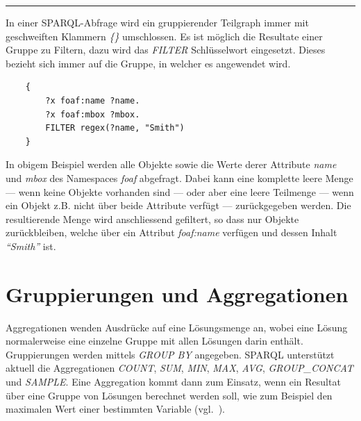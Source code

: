 \noindent\rule[1ex]{\textwidth}{1pt}

In einer SPARQL-Abfrage wird ein gruppierender Teilgraph immer mit geschweiften Klammern \textit{\{\}} umschlossen. Es ist möglich die Resultate einer Gruppe zu Filtern, dazu wird das \textit{FILTER} Schlüsselwort eingesetzt. Dieses bezieht sich immer auf die Gruppe, in welcher es angewendet wird.

\lstset{language=XML}
\begin{lstlisting}
    {
        ?x foaf:name ?name.
        ?x foaf:mbox ?mbox.
        FILTER regex(?name, "Smith")
    }
\end{lstlisting}

In obigem Beispiel werden alle Objekte sowie die Werte derer Attribute \textit{name} und \textit{mbox} des Namespaces \textit{foaf} abgefragt. Dabei kann eine komplette leere Menge --- wenn keine Objekte vorhanden sind --- oder aber eine leere Teilmenge --- wenn ein Objekt z.B. nicht über beide Attribute verfügt --- zurückgegeben werden. Die resultierende Menge wird anschliessend gefiltert, so dass nur Objekte zurückbleiben, welche über ein Attribut \textit{foaf:name} verfügen und dessen Inhalt \textit{``Smith''} ist.

\section{Gruppierungen und Aggregationen}
\label{sec:sparql_gruppierungenaggregationen}

Aggregationen wenden Ausdrücke auf eine Lösungsmenge an, wobei eine Lösung normalerweise eine einzelne Gruppe mit allen Lösungen darin enthält. Gruppierungen werden mittels \textit{GROUP BY} angegeben.
SPARQL unterstützt aktuell die Aggregationen \textit{COUNT}, \textit{SUM}, \textit{MIN}, \textit{MAX}, \textit{AVG}, \textit{GROUP\_CONCAT} und \textit{SAMPLE}. Eine Aggregation kommt dann zum Einsatz, wenn ein Resultat über eine Gruppe von Lösungen berechnet werden soll, wie zum Beispiel den maximalen Wert einer bestimmten Variable (vgl.~\cite[11 Aggregates]{w3sparql_querylang}).

